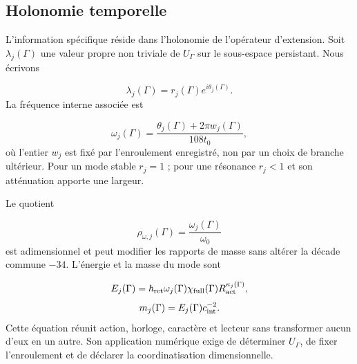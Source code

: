 \subsection{Holonomie temporelle}
L’information spécifique réside dans l’holonomie de l’opérateur d’extension. Soit \(\lambda_j(\Gamma)\) une valeur propre non triviale de \(U_\Gamma\) sur le sous-espace persistant. Nous écrivons

\[
 \lambda_j(\Gamma)=r_j(\Gamma)e^{i\theta_j(\Gamma)}.
\]
La fréquence interne associée est

\[
 \omega_j(\Gamma)
 =\frac{\theta_j(\Gamma)+2\pi w_j(\Gamma)}{108t_0},
\]
où l’entier \(w_j\) est fixé par l’enroulement enregistré, non par un choix de branche ultérieur. Pour un mode stable \(r_j=1\) ; pour une résonance \(r_j<1\) et son atténuation apporte une largeur.

Le quotient

\[
 \rho_{\omega,j}(\Gamma)
 =\frac{\omega_j(\Gamma)}{\omega_0}
\]
est adimensionnel et peut modifier les rapports de masse sans altérer la décade commune \(-34\). L’énergie et la masse du mode sont

\[
 E_j(\Gamma)=\hbar_{\rm ret}\omega_j(\Gamma)
 \chi_{\rm full}(\Gamma)R_{\rm act}^{\kappa_j(\Gamma)},
\]
\[
 m_j(\Gamma)=E_j(\Gamma)c_{\rm int}^{-2}.
\]
Cette équation réunit action, horloge, caractère et lecteur sans transformer aucun d’eux en un autre. Son application numérique exige de déterminer \(U_\Gamma\), de fixer l’enroulement et de déclarer la coordinatisation dimensionnelle.
